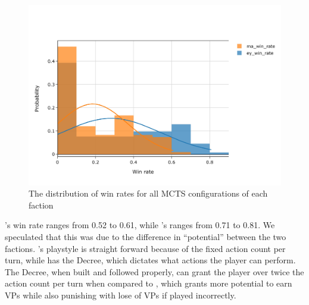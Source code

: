 \begin{figure}[h!]
    \begin{center}
      \includegraphics[width=\textwidth]{./images/fig-stage-1-win-rate-dist.jpeg}
    \end{center}
    \caption{The distribution of win rates for all MCTS configurations of each faction}
    \label{fig:stage-1-win-rate-dist}
\end{figure}



\Marquise{}'s win rate ranges from 0.52 to 0.61, while \Eyrie's ranges from 0.71 to 0.81. We speculated that this was due to the difference in ``potential'' between the two factions. \Marquise{}'s playstyle is straight forward because of the fixed action count per turn, while \Eyrie{} has the Decree, which dictates what actions the \Eyrie{} player can perform. The Decree, when built and followed properly, can grant the \Eyrie{} player over twice the action count per turn when compared to \Marquise{}, which grants more potential to earn VPs while also punishing with lose of VPs if played incorrectly.

